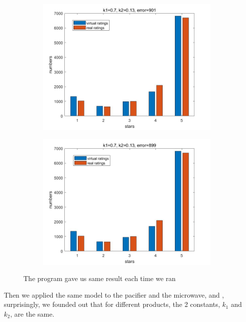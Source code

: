 \documentclass[12pt]{article}  %
\begin{document}
\begin{figure}[H]
  \centering
  \begin{subfigure}{.5\textwidth}
    \centering
    \includegraphics[width=\linewidth]{Q4picture/1.jpg}
    \label{fig:}
  \end{subfigure}%
  \begin{subfigure}{.5\textwidth}
    \centering
    \includegraphics[width=\linewidth]{Q4picture/2.jpg}
    \label{fig:}
  \end{subfigure}
  \caption{The program gave us same result each time we ran}
  \label{fig:}
\end{figure}

Then we applied the same model to the pacifier and the microwave, and , surprisingly, we founded out that for different products, the 2 constants, $k_1$ and $k_2$, are the same.
\end{document}
